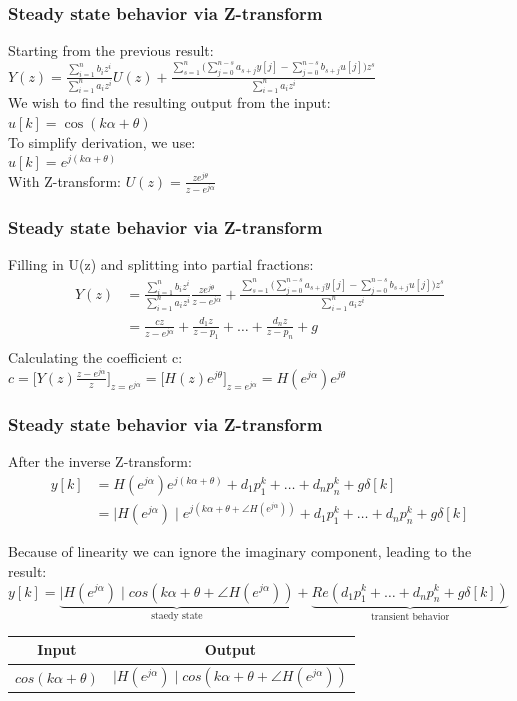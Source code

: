 \begin{frame}
	\frametitle{Steady state behavior via Z-transform}
	Starting from the previous result:\\
	$Y(z) = \frac{\sum\limits_{i=1}^{n} b_i z^i}{\sum\limits_{i=1}^{n} a_i z^i} U(z) + \frac{\sum\limits_{s=1}^{n}\Bigg(\sum\limits_{j=0}^{n-s}a_{s+j}y[j]-\sum\limits_{j=0}^{n-s}b_{s+j}u[j]\Bigg)z^{s}}{\sum\limits_{i=1}^{n}a_i z^i}$\\
	We wish to find the resulting output from the input:\\
	$ u[k] = \cos(k\alpha + \theta)$\\
	To simplify derivation, we use:\\
	$u[k] = e^{j(k\alpha + \theta)}$\\
	With Z-transform:	$U(z) = \frac{ze^{j\theta}}{z-e^{j\alpha}}$
	
\end{frame}
\begin{frame}
	\frametitle{Steady state behavior via Z-transform}
	Filling in U(z) and splitting into partial fractions:
	\begin{align*}
			Y(z) &= \frac{\sum\limits_{i=1}^{n} b_i z^i}{\sum\limits_{i=1}^{n} a_i z^i} \frac{ze^{j\theta}}{z-e^{j\alpha}} + \frac{\sum\limits_{s=1}^{n}\Bigg(\sum\limits_{j=0}^{n-s}a_{s+j}y[j]-\sum\limits_{j=0}^{n-s}b_{s+j}u[j]\Bigg)	z^{s}}{\sum\limits_{i=1}^{n} a_i z^{i}}\\
			& = \frac{cz}{z-e^{j\alpha}} + \frac{d_1z}{z-p_1} + \dots + \frac{d_nz}{z-p_n}+g\\
	\end{align*}
	Calculating the coefficient c:\\
	$c= \bigg[Y(z)\frac{z-e^{j\alpha}}{z}\bigg]_{z=e^{j\alpha}} = \bigg[H(z)e^{j\theta}\bigg]_{z=e^{j\alpha}} = H(e^{j\alpha})e^{j\theta}$\\

\end{frame}
\begin{frame}
	\frametitle{Steady state behavior via Z-transform}
	\small{
		After the inverse Z-transform:
		\begin{align*}			y[k]&=H(e^{j\alpha})e^{j(k\alpha+\theta)}+d_1p_1^k+\dots+d_np_n^{k}+g\delta[k]\\
		 &= \mid H(e^{j\alpha}) \mid e^{j(k\alpha+\theta+\angle H(e^{j\alpha}))} +d_1p_1^k+\dots+d_np_n^{k}+g\delta[k]
		\end{align*}
		
	Because of linearity we can ignore the imaginary component, leading to the result:\\
	$y[k] =  \underbrace{\mid H(e^{j\alpha}) \mid cos(k\alpha+\theta+\angle H(e^{j\alpha}))}_{\text{staedy state}} + \underbrace{Re(d_1p_1^k+\dots+d_np_n^{k}+g\delta[k])}_{\text{transient behavior}}$\\
	\begin{tabular}{|c|c|}
		\hline Input & Output \\ 
		\hline $cos(k\alpha + \theta)$ &  $\mid H(e^{j\alpha}) \mid cos(k\alpha+\theta+\angle H(e^{j\alpha}))$ \\ 
		\hline 
	\end{tabular} }
\end{frame}

